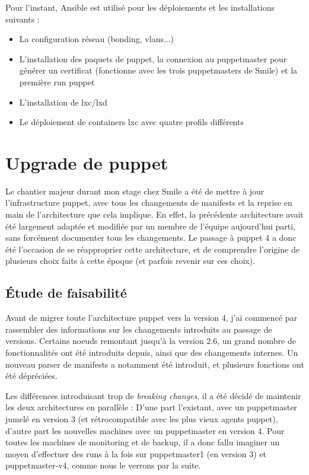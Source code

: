 \documentclass[14 pt,a4paper]{extreport}
\begin{document}
Pour l'instant, Ansible est utilisé pour les déploiements et les installations suivants :

\begin{itemize}
	\item La configuration réseau (bonding, vlans...)
	\item L'installation des paquets de puppet, la connexion au puppetmaster pour générer un certificat (fonctionne avec les trois puppetmasters de Smile) et la première run puppet
	\item L'installation de lxc/lxd
	\item Le déploiement de containers lxc avec quatre profils différents
\end{itemize}

\section{Upgrade de puppet}

Le chantier majeur durant mon stage chez Smile a été de mettre à jour l'infrastructure puppet, avec tous les changements de manifests et la reprise en main de l'architecture que cela implique. En effet, la précédente architecture avait été largement adaptée et modifiée par un membre de l'équipe aujourd'hui parti, sans forcément documenter tous les changements. Le passage à puppet 4 a donc été l'occasion de se réapproprier cette architecture, et de comprendre l'origine de plusieurs choix faits à cette époque (et parfois revenir sur ces choix).

\subsection{Étude de faisabilité}

Avant de migrer toute l'architecture puppet vers la version 4, j'ai commencé par rassembler des informations sur les changements introduits au passage de versions. Certains noeuds remontant jusqu'à la version 2.6, un grand nombre de fonctionnalités ont été introduits depuis, ainsi que des changements internes. Un nouveau parser de manifests a notamment été introduit, et plusieurs fonctions ont été dépréciées.

Les différences introduisant trop de \emph{breaking changes}, il a été décidé de maintenir les deux architectures en parallèle : D'une part l'existant, avec un puppetmaster jumelé en version 3 (et rétrocompatible avec les plus vieux agents puppet), d'autre part les nouvelles machines avec un puppetmaster en version 4. Pour toutes les machines de monitoring et de backup, il a donc fallu imaginer un moyen d'effectuer des runs à la fois sur puppetmaster1 (en version 3) et puppetmaster-v4, comme nous le verrons par la suite.
\end{document}
